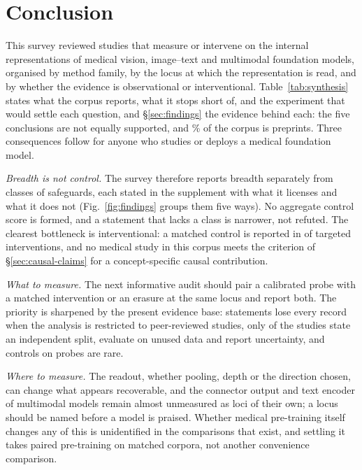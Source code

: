 \section{Conclusion}
\label{sec:conclusion}

This survey reviewed \Ncore{} studies that measure or intervene on the internal representations of
medical vision, image--text and multimodal foundation models, organised by method family, by the locus
at which the representation is read, and by whether the evidence is observational or interventional.
Table~\ref{tab:synthesis} states what the corpus reports, what it stops short of, and the experiment
that would settle each question, and \S\ref{sec:findings} the evidence behind each: the five
conclusions are not equally supported, and \Pctpreprint\% of the corpus is preprints. Three
consequences follow for anyone who studies or deploys a medical foundation model.

\emph{Breadth is not control.} The survey therefore reports breadth separately from \Vnclasses{}
classes of safeguards, each stated in the supplement with what it licenses and what it does not
(Fig.~\ref{fig:findings} groups them five ways). No aggregate control score is formed, and a statement that lacks a class is
narrower, not refuted. The clearest bottleneck is interventional: a matched control is reported in
\Vspc{} of \Vspcn{} targeted interventions, and no medical study in this corpus meets the criterion of
\S\ref{sec:causal-claims} for a concept-specific causal contribution.

\emph{What to measure.} The next informative audit should pair a calibrated probe with a matched
intervention or an erasure at the same locus and report both. The priority is sharpened by the present
evidence base: \Fsensrefemptyn{} statements lose every record when the analysis is restricted to
peer-reviewed studies, only \Nminvalid{} of the \Ncore{} studies state an independent split, evaluate on
unused data and report uncertainty, and controls on probes are rare.

\emph{Where to measure.} The readout, whether pooling, depth or the direction chosen, can change what
appears recoverable, and the connector output and text encoder of multimodal models remain almost
unmeasured as loci of their own; a locus should be named before a model is praised. Whether medical
pre-training itself changes any of this is unidentified in the comparisons that exist, and settling it
takes paired pre-training on matched corpora, not another convenience comparison.
